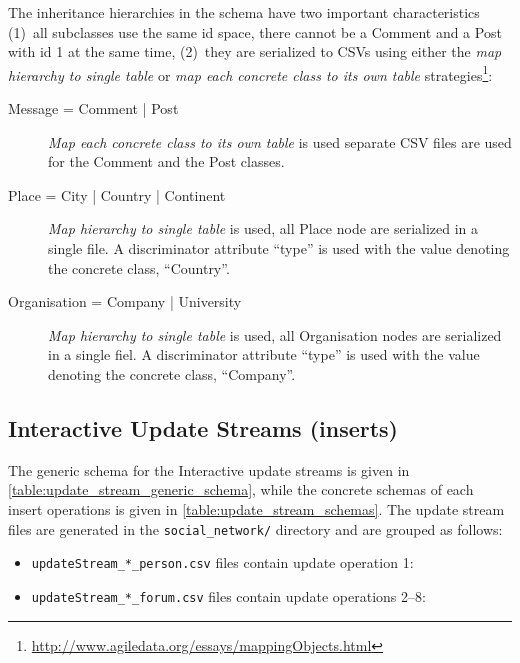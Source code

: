 The inheritance hierarchies in the schema have two important characteristics
(1)~all subclasses use the same id space, \eg there cannot be a Comment and a Post with id 1 at the same time,
(2)~they are serialized to CSVs using either the \emph{map hierarchy to single table} or \emph{map each concrete class to its own table} strategies\footnote{\url{http://www.agiledata.org/essays/mappingObjects.html}}:

\begin{description}
    \item[Message = Comment | Post]
    \emph{Map each concrete class to its own table} is used \ie separate CSV files are used for the Comment and the Post classes.

    \item[Place = City | Country | Continent]
    \emph{Map hierarchy to single table} is used, \ie all Place node are serialized in a single file. A discriminator attribute ``type'' is used with the value denoting the concrete class, \eg ``Country''.

    \item[Organisation = Company | University]
    \emph{Map hierarchy to single table} is used, \ie all Organisation nodes are serialized in a single fiel. A discriminator attribute ``type'' is used with the value denoting the concrete class, \eg ``Company''.
\end{description}

\subsection{Interactive Update Streams (inserts)}

The generic schema for the Interactive update streams is given in \autoref{table:update_stream_generic_schema}, while the concrete schemas of each insert operations is given in \autoref{table:update_stream_schemas}.
The update stream files are generated in the \texttt{social\_network/} directory and are grouped as follows:

\begin{itemize}
    \item \texttt{updateStream\_*\_person.csv} files contain update operation 1: 
    \item \texttt{updateStream\_*\_forum.csv} files contain update operations 2--8: %
\end{itemize}

